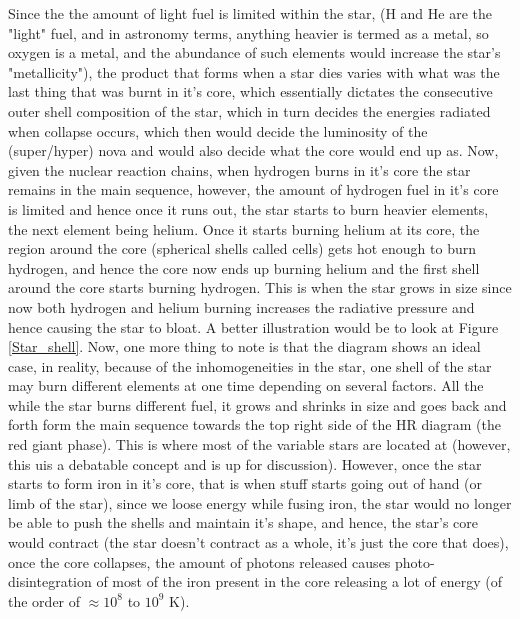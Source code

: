 \documentclass[a4paper,twoside]{report}
\numberwithin{equation}{section}
\begin{document}
Since the the amount of light fuel is limited within the star, (H and He are the "light" fuel, and in astronomy terms, anything heavier is termed as a metal, so oxygen is a metal, and the abundance of such elements would increase the star's "metallicity"), the product that forms when a star dies varies with what was the last thing that was burnt in it's core, which essentially dictates the consecutive outer shell composition of the star, which in turn decides the energies radiated when collapse occurs, which then would decide the luminosity of the (super/hyper) nova and would also decide what the core would end up as. Now, given the nuclear reaction chains, when hydrogen burns in it's core the star remains in the main sequence, however, the amount of hydrogen fuel in it's core is limited and hence once it runs out, the star starts to burn heavier elements, the next element being helium. Once it starts burning helium at its core, the region around the core (spherical shells called cells) gets hot enough to burn hydrogen, and hence the core now ends up burning helium and the first shell around the core starts burning hydrogen. This is when the star grows in size since now both hydrogen and helium burning increases the radiative pressure and hence causing the star to bloat. A better illustration would be to look at Figure \ref{Star_shell}. Now, one more thing to note is that the diagram shows an ideal case, in reality, because of the inhomogeneities in the star, one shell of the star may burn different elements at one time depending on several factors. All the while the star burns different fuel, it grows and shrinks in size and goes back and forth form the main sequence towards the top right side of the HR diagram (the red giant phase). This is where most of the variable stars are located at (however, this uis a debatable concept and is up for discussion). However, once the star starts to form iron in it's core, that is when stuff starts going out of hand (or limb of the star), since we loose energy while fusing iron, the star would no longer be able to push the shells and maintain it's shape, and hence, the star's core would contract (the star doesn't contract as a whole, it's just the core that does), once the core collapses, the amount of photons released causes photo-disintegration of most of the iron present in the core releasing a lot of energy (of the order of $\approx 10^8$ to $10^9$ K). 
\end{document}
